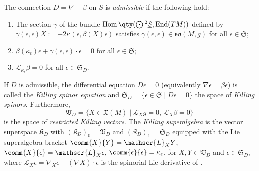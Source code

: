 \documentclass[10pt,a4paper]{amsart}
\numberwithin{equation}{section}
\newcommand{\fso}{\mathfrak{so}}
\newcommand{\fX}{\mathfrak{X}}
\newcommand{\fK}{\mathfrak{K}}
\newcommand{\fS}{\mathfrak{S}}
\newcommand{\fV}{\mathfrak{V}}
\newcommand{\eL}{\mathscr{L}}
\newcommand{\Sbundle}{\underline{S}}
\newcommand{\Odot}{\mathchoice{{\textstyle\bigodot}}{\bigodot}{\bigodot}{\bigodot}}
\newcommand{\1}{\mathbbm{1}}
\DeclareMathOperator{\End}{End}
\DeclareMathOperator{\Hom}{Hom}
\begin{document}
\begin{Definition}\label{def:killing-spinor}
	The connection $D=\nabla-\beta$ on $\Sbundle$ is \emph{admissible} if the following hold:
	\begin{enumerate}\itemsep=0pt
		\item The section $\gamma$ of the bundle $\Hom\qty(\Odot^2\Sbundle,\End(TM))$ defined by $\gamma(\epsilon,\epsilon)X := - 2\kappa(\epsilon,\beta(X)\epsilon)$ satisfies $\gamma(\epsilon,\epsilon)\in\fso(M,g)$ for all $\epsilon\in\fS$; %
		\item $\beta(\kappa_\epsilon)\epsilon
				+ \gamma(\epsilon,\epsilon)\cdot\epsilon
				= 0$ for all $\epsilon\in\fS$; %
		\item $\eL_{\kappa_\epsilon}\beta = 0$ for all $\epsilon\in\fS_D$. %
	\end{enumerate}
	If $D$ is admissible, the differential equation $D\epsilon=0$ (equivalently $\nabla\epsilon =\beta\epsilon$) is called the \emph{Killing spinor equation} and
$
		\fS_D = \{\epsilon\in\fS \mid D\epsilon = 0\}
$
	the space of \emph{Killing spinors}. Furthermore,
\[
		\fV_D = \{X\in \fX(M) \mid \eL_Xg =0,\, \eL_X\beta = 0\}
\]
	is the space of \emph{restricted Killing vectors}. The \emph{Killing superalgebra} is the vector superspace $\fK_D$ with $(\fK_D)_{\overline 0}=\fV_D$ and $(\fK_D)_{\overline 1}=\fS_D$ equipped with the Lie superalgebra bracket
$\comm{X}{Y} = \eL_X Y$,
$\comm{X}{\epsilon} = \eL_X \epsilon$,
$\comm{\epsilon}{\epsilon} = \kappa_\epsilon$,
	for $X,Y\in\fV_D$ and $\epsilon\in\fS_D$, where $\eL_X \epsilon=\nabla_X\epsilon - (\nabla X)\cdot\epsilon$ is the spinorial Lie derivative of \cite{Kosmann1971}.
\end{Definition}
\end{document}
